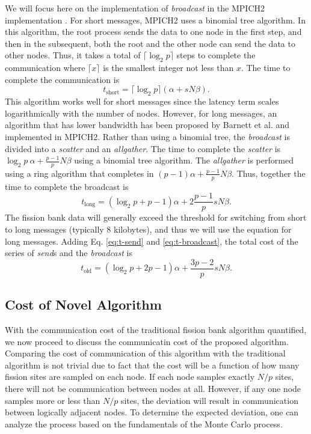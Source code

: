 \documentclass[11pt]{article}
\begin{document}
We will focus here on the implementation of \emph{broadcast} in the
MPICH2 implementation \cite{mpich}. For short messages, MPICH2 uses a
binomial tree algorithm. In this algorithm, the root process sends the
data to one node in the first step, and then in the subsequent, both
the root and the other node can send the data to other nodes. Thus, it
takes a total of $\lceil \log_2 p \rceil$ steps to complete the
communication where $\lceil x \rceil$ is the smallest integer not less
than $x$. The time to complete the communication is
\begin{equation}
  t_{\text{short}} = \lceil \log_2 p \rceil \left ( \alpha + sN\beta
  \right ).
\end{equation}
This algorithm works well for short messages since the latency term
scales logarithmically with the number of nodes. However, for long
messages, an algorithm that has lower bandwidth has been proposed by
Barnett et al. \cite{barnett} and implemented in MPICH2. Rather than
using a binomial tree, the \emph{broadcast} is divided into a
\emph{scatter} and an \emph{allgather}. The time to complete the
\emph{scatter} is $ \log_2 p \: \alpha + \frac{p-1}{p} N\beta$ using a
binomial tree algorithm. The \emph{allgather} is performed using a
ring algorithm that completes in $(p-1) \alpha + \frac{p-1}{p}
N\beta$. Thus, together the time to complete the broadcast is
\begin{equation}\label{eq:t-broadcast}
  t_{\text{long}} = \left ( \log_2 p + p - 1 \right ) \alpha + 2
  \frac{p-1}{p} sN\beta.
\end{equation}
The fission bank data will generally exceed the threshold for
switching from short to long messages (typically 8 kilobytes), and
thus we will use the equation for long messages. Adding
Eq. \ref{eq:t-send} and \ref{eq:t-broadcast}, the total cost of the
series of \emph{send}s and the \emph{broadcast} is
\begin{equation}
  t_{\text{old}} = \left ( \log_2 p + 2p - 1 \right ) \alpha +
  \frac{3p-2}{p} sN\beta.
\end{equation}

\subsection{Cost of Novel Algorithm}

With the communication cost of the traditional fission bank algorithm
quantified, we now proceed to discuss the communicatin cost of the
proposed algorithm. Comparing the cost of communication of this
algorithm with the traditional algorithm is not trivial due to fact
that the cost will be a function of how many fission sites are sampled
on each node. If each node samples exactly $N/p$ sites, there will not
be communication between nodes at all. However, if any one node
samples more or less than $N/p$ sites, the deviation will result in
communication between logically adjacent nodes. To determine the
expected deviation, one can analyze the process based on the
fundamentals of the Monte Carlo process.
\end{document}
